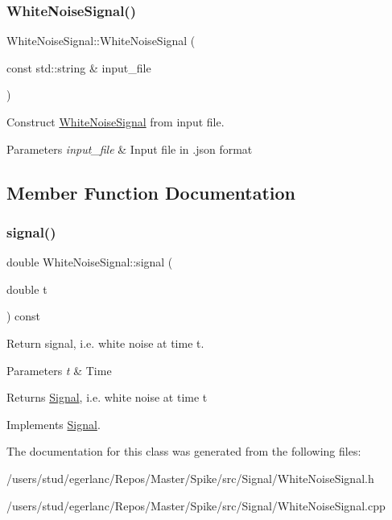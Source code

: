 \subsubsection{\texorpdfstring{White\+Noise\+Signal()}{WhiteNoiseSignal()}\hspace{0.1cm}{\footnotesize\ttfamily [2/2]}}
{\footnotesize\ttfamily White\+Noise\+Signal\+::\+White\+Noise\+Signal (\begin{DoxyParamCaption}\item[{const std\+::string \&}]{input\+\_\+file }\end{DoxyParamCaption})}



Construct \hyperlink{classWhiteNoiseSignal}{White\+Noise\+Signal} from input file. 


\begin{DoxyParams}{Parameters}
{\em input\+\_\+file} & Input file in .json format \\
\hline
\end{DoxyParams}


\subsection{Member Function Documentation}
\mbox{\label{classWhiteNoiseSignal_a99ec1e0c59f5ded7623ffbcaa5318238}} 
\subsubsection{\texorpdfstring{signal()}{signal()}}
{\footnotesize\ttfamily double White\+Noise\+Signal\+::signal (\begin{DoxyParamCaption}\item[{double}]{t }\end{DoxyParamCaption}) const\hspace{0.3cm}{\ttfamily [virtual]}}



Return signal, i.\+e. white noise at time t. 


\begin{DoxyParams}{Parameters}
{\em t} & Time \\
\hline
\end{DoxyParams}
\begin{DoxyReturn}{Returns}
\hyperlink{classSignal}{Signal}, i.\+e. white noise at time t 
\end{DoxyReturn}


Implements \hyperlink{classSignal_a32c22f17b70b215d78171716f844fa60}{Signal}.



The documentation for this class was generated from the following files\+:\begin{DoxyCompactItemize}
\item 
/users/stud/egerlanc/\+Repos/\+Master/\+Spike/src/\+Signal/White\+Noise\+Signal.\+h\item 
/users/stud/egerlanc/\+Repos/\+Master/\+Spike/src/\+Signal/White\+Noise\+Signal.\+cpp\end{DoxyCompactItemize}
